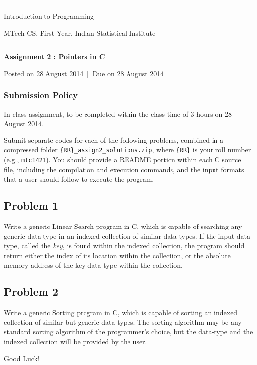 \documentclass[11pt,a4paper]{article}
\begin{document}
\pagestyle{empty}

\begin{center}
  \hrule
  \vspace*{10pt}
  
  {\huge Introduction to Programming}

  \vspace*{10pt}

  {\large MTech CS, First Year, Indian Statistical Institute}
  
  \vspace*{10pt}  
  \hrule
  \vspace*{20pt}
  
  \textbf{\Large Assignment 2 : Pointers in C}

  Posted on 28 August 2014 $ \ \vert \ $ Due on 28 August 2014

  \vspace*{10pt}
  
\end{center}

\subsubsection*{Submission Policy}

In-class assignment, to be completed within the class time of 3 hours on 28 August 2014.

Submit separate codes for each of the following problems, combined in a compressed folder \texttt{\{RR\}\_assign2\_solutions.zip}, where \texttt{\{RR\}} is your roll number (e.g., \texttt{mtc1421}). You should provide a README portion within each C source file, including the compilation and execution commands, and the input formats that a user should follow to execute the program.


\subsection*{Problem 1}

Write a generic Linear Search program in C, which is capable of searching any generic data-type in an indexed collection of similar data-types. If the input data-type, called the \emph{key}, is found within the indexed collection, the program should return either the index of its location within the collection, or the absolute memory address of the key data-type within the collection.


\subsection*{Problem 2}

Write a generic Sorting program in C, which is capable of sorting an indexed collection of similar but generic data-types. The sorting algorithm may be any standard sorting algorithm of the programmer's choice, but the data-type and the indexed collection will be provided by the user.


\vfill

\hfill Good Luck! {\Large\smiley{}}
\end{document}
